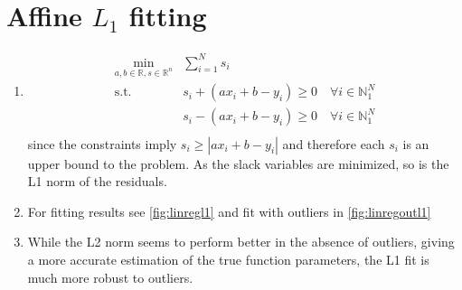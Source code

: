 \documentclass[oneside, a4paper]{book}
\newcommand\abs[1]{\left|#1\right|}
\begin{document}
\section{Affine $L_1$ fitting}
\begin{enumerate}
  \item \begin{align*}
    \min_{a,b\in\mathds{R}, s\in\mathds{R}^n} &\sum_{i=1}^{N} s_i \\
    \text{s.t.}\quad  &s_i + (a x_i + b - y_i) \geq 0 \quad\forall i\in\mathds{N}_1^N\\
                      &s_i - (a x_i + b - y_i) \geq 0 \quad\forall i\in\mathds{N}_1^N\\
  \end{align*}
  since the constraints imply $s_i \geq \abs{a x_i + b - y_i}$ and therefore each $s_i$ is an upper bound to the problem. As the slack variables are minimized, so is the L1 norm of the residuals.
  \item For fitting results see \autoref{fig:linregl1} and fit with outliers in \autoref{fig:linregoutl1}
  \item While the L2 norm seems to perform better in the absence of outliers, giving a more accurate estimation of the true function parameters, the L1 fit is much more robust to outliers.
\end{enumerate}
\end{document}
